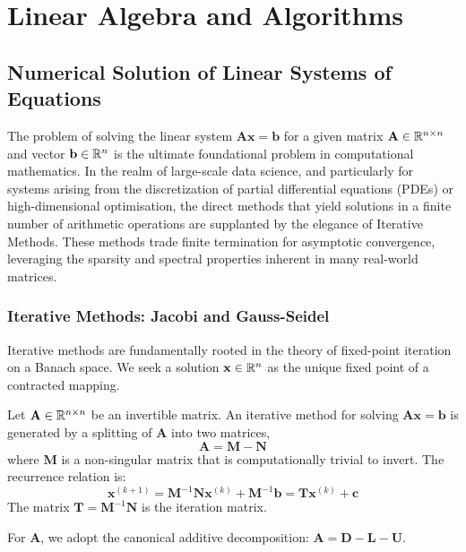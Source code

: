 \chapter{Linear Algebra and Algorithms}

\section{Numerical Solution of Linear Systems of Equations}

The problem of solving the linear system $\mathbf{A}\mathbf{x} = \mathbf{b}$ for a given matrix $\mathbf{A} \in \mathbb{R}^{n \times n}$ and vector $\mathbf{b} \in \mathbb{R}^n$ is the ultimate foundational problem in computational mathematics. In the realm of large-scale data science, and particularly for systems arising from the discretization of partial differential equations (PDEs) or high-dimensional optimisation, the direct methods that yield solutions in a finite number of arithmetic operations are supplanted by the elegance of Iterative Methods. These methods trade finite termination for asymptotic convergence, leveraging the sparsity and spectral properties inherent in many real-world matrices.

\subsection{Iterative Methods: Jacobi and Gauss-Seidel}

Iterative methods are fundamentally rooted in the theory of fixed-point iteration on a Banach space. We seek a solution $\mathbf{x} \in \mathbb{R}^n$ as the unique fixed point of a contracted mapping.

\begin{definition}
Let $\mathbf{A} \in \mathbb{R}^{n \times n}$ be an invertible matrix. An iterative method for solving $\mathbf{A}\mathbf{x} = \mathbf{b}$ is generated by a splitting of $\mathbf{A}$ into two matrices,
\[ \mathbf{A} = \mathbf{M} - \mathbf{N} \]
where $\mathbf{M}$ is a non-singular matrix that is computationally trivial to invert. The recurrence relation is:
\[ \mathbf{x}^{(k+1)} = \mathbf{M}^{-1}\mathbf{N}\mathbf{x}^{(k)} + \mathbf{M}^{-1}\mathbf{b} = \mathbf{T}\mathbf{x}^{(k)} + \mathbf{c} \]
The matrix $\mathbf{T} = \mathbf{M}^{-1}\mathbf{N}$ is the iteration matrix.
\end{definition}

For $\mathbf{A}$, we adopt the canonical additive decomposition: $\mathbf{A} = \mathbf{D} - \mathbf{L} - \mathbf{U}$.

